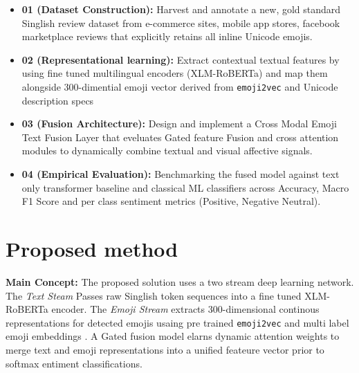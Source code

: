 \documentclass[conference]{IEEEtran}
\begin{document}
\begin{itemize}
      \item \textbf{01 (Dataset Construction):} Harvest and annotate a new, gold standard Singlish review dataset
            from e-commerce sites, mobile app stores, facebook marketplace reviews that explicitly retains all
            inline Unicode emojis.
      \item \textbf{02 (Representational learning):} Extract contextual textual features by using fine tuned multilingual
            encoders (XLM-RoBERTa) and map them alongside 300-dimential emoji vector derived from \texttt{emoji2vec} and
            Unicode description specs
      \item \textbf{03 (Fusion Architecture):} Design and implement a Cross Modal Emoji Text Fusion Layer that eveluates
            Gated feature Fusion and cross attention modules  to dynamically combine textual and visual affective signals.
      \item \textbf{04 (Empirical Evaluation):} Benchmarking the fused model against text only transformer baseline and classical
            ML classifiers across Accuracy, Macro F1 Score and per class sentiment metrics (Positive, Negative Neutral).
\end{itemize}

\section{Proposed method}
\textbf{Main Concept:} The proposed solution uses a two stream deep learning network. The \textit{Text Steam} Passes raw Singlish token
sequences into a fine tuned XLM-RoBERTa encoder. The \textit{Emoji Stream} extracts 300-dimensional continous representations for detected
emojis usaing pre trained \texttt{emoji2vec} \cite{eisner2016emoji2vec} and multi label emoji embeddings \cite{singh2024predicting}. A Gated fusion model
elarns dynamic attention weights to merge text and emoji representations into a unified feateure vector prior to softmax entiment classifications.
\end{document}
